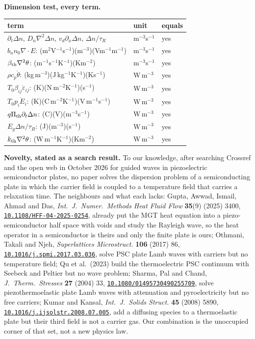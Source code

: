 \documentclass[11pt]{article}
\newcommand{\doi}[1]{\href{https://doi.org/#1}{\texttt{#1}}}
\begin{document}
\noindent\textbf{Dimension test, every term.}
\begin{center}\footnotesize
\begin{tabular}{p{4.6cm}p{3.0cm}p{5.4cm}}
\toprule
term & unit & equals\\
\midrule
$\partial_t\Delta n$, $D_n\nabla^2\Delta n$, $v_d\partial_x\Delta n$, $\Delta n/\tau_R$ & m$^{-3}$s$^{-1}$ & yes\\
$b_nn_0\nabla\!\cdot\!E$: (m$^2$V$^{-1}$s$^{-1}$)(m$^{-3}$)(Vm$^{-1}$m$^{-1}$) & m$^{-3}$s$^{-1}$ & yes\\
$\beta_{\rm th}\nabla^2\theta$: (m$^{-1}$s$^{-1}$K$^{-1}$)(Km$^{-2}$) & m$^{-3}$s$^{-1}$ & yes\\
$\rho c_p\dot\theta$: (kg\,m$^{-3}$)(J\,kg$^{-1}$K$^{-1}$)(Ks$^{-1}$) & W\,m$^{-3}$ & yes\\
$T_0\beta_{ij}\dot\varepsilon_{ij}$: (K)(N\,m$^{-2}$K$^{-1}$)(s$^{-1}$) & W\,m$^{-3}$ & yes\\
$T_0p_i\dot E_i$: (K)(C\,m$^{-2}$K$^{-1}$)(V\,m$^{-1}$s$^{-1}$) & W\,m$^{-3}$ & yes\\
$q\Pi_{\rm th}\partial_t\Delta n$: (C)(V)(m$^{-3}$s$^{-1}$) & W\,m$^{-3}$ & yes\\
$E_g\Delta n/\tau_R$: (J)(m$^{-3}$)(s$^{-1}$) & W\,m$^{-3}$ & yes\\
$k_{\rm th}\nabla^2\theta$: (W\,m$^{-1}$K$^{-1}$)(Km$^{-2}$) & W\,m$^{-3}$ & yes\\
\bottomrule
\end{tabular}
\end{center}

\noindent\textbf{Novelty, stated as a search result.} To our knowledge, after searching Crossref and the
open web in October 2026 for guided waves in piezoelectric semiconductor plates, no paper solves the
dispersion problem of a semiconducting plate in which the carrier field is coupled to a temperature field
that carries a relaxation time. The neighbours and what each lacks: Gupta, Awwad, Ismail, Ahmad and Das, \emph{Int.\ J.\ Numer.\ Methods Heat Fluid Flow} \textbf{35}(9) (2025) 3400, \doi{10.1108/HFF-04-2025-0254}, already put the MGT heat equation into a piezo-semiconductor half space with voids and study the Rayleigh wave, so the heat operator in a semiconductor is theirs and only the finite plate is ours; Othmani, Takali and Njeh,
\emph{Superlattices Microstruct.} \textbf{106} (2017) 86, \doi{10.1016/j.spmi.2017.03.036}, solve PSC plate
Lamb waves with carriers but no temperature field; Qu et al.\ (2023) build the thermoelectric PSC
continuum with Seebeck and Peltier but no wave problem; Sharma, Pal and Chand, \emph{J.\ Therm.\ Stresses}
\textbf{27} (2004) 33, \doi{10.1080/01495730490255709}, solve piezothermoelastic plate Lamb waves with
attenuation and pyroelectricity but no free carriers; Kumar and Kansal, \emph{Int.\ J.\ Solids Struct.}
\textbf{45} (2008) 5890, \doi{10.1016/j.ijsolstr.2008.07.005}, add a diffusing species to a thermoelastic
plate but their third field is not a carrier gas. Our combination is the unoccupied corner of that set,
not a new physics law.
\end{document}
